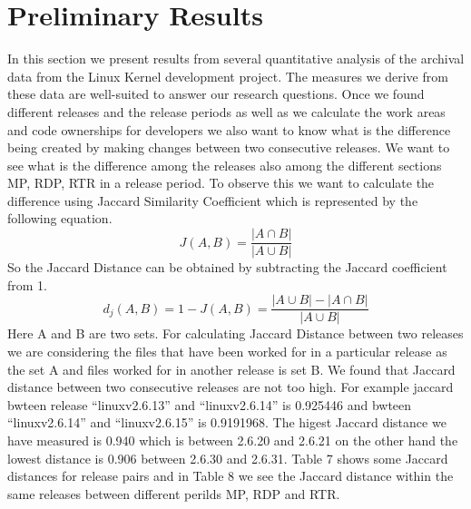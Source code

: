 \documentclass{acm_proc_article-sp}
\begin{document}
\section{Preliminary Results}
In this section we present results from several quantitative analysis of the archival data from the Linux Kernel development project. The measures we derive from these data are well-suited to answer our research questions. Once we found different releases and the release periods as well as we calculate the work areas and code ownerships for developers we also want to know what is the difference being created by making changes between two consecutive releases. We want to see what is the difference among the releases also among the different sections MP, RDP, RTR in a release period. To observe this we want to calculate the difference using Jaccard Similarity Coefficient \cite{jaccard_alpine} which is represented by the following equation.
\begin{equation} J(A, B) =\frac{|A \cap B|}{|A \cup B|} \end{equation}
So the Jaccard Distance can be obtained by subtracting the Jaccard coefficient from 1.
\begin{equation} d_j(A, B) = 1 - J(A, B) = \frac{|A \cup B|-|A \cap B|}{|A \cup B|} \end{equation}
Here A and B are two sets. For calculating Jaccard Distance between two releases we are considering the files that have been worked for in a particular release as the set A and files worked for in another release is set B. We found that Jaccard distance between two consecutive releases are not too high. For example jaccard bwteen release ``linuxv2.6.13'' and ``linuxv2.6.14'' is 0.925446 and bwteen ``linuxv2.6.14'' and ``linuxv2.6.15'' is 0.9191968. The higest Jaccard distance we have measured is 0.940 which is between 2.6.20 and 2.6.21 on the other hand the lowest distance is 0.906 between 2.6.30 and 2.6.31. Table 7 shows some Jaccard distances for release pairs and in Table 8 we see the Jaccard distance within the same releases between different perilds MP, RDP and RTR.
\end{document}
